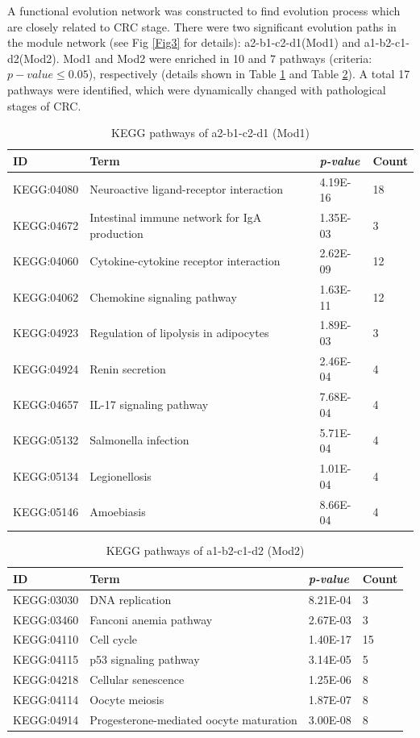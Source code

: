 \documentclass[conference]{IEEEtran}
\begin{document}
A functional evolution  network was constructed to find evolution process which are closely related to CRC stage.
There were two significant evolution paths in the module network (see Fig \ref{Fig3} for details): a2-b1-c2-d1(Mod1) and a1-b2-c1-d2(Mod2). 
Mod1 and Mod2 were enriched in 10 and 7 pathways (criteria: $p-value \leqslant 0.05$), respectively (details shown in Table \ref{tab5} and Table \ref{tab6}). 
A total 17 pathways were identified, which were dynamically changed with pathological stages of CRC. 

\begin{table}[htbp]
	\caption{KEGG pathways of a2-b1-c2-d1 (Mod1)}
	\label{tab5}
	\begin{center}
		\begin{tabular}{lp{3.5cm}ll}
			\hline
			ID & Term & \emph{p-value} & Count\\
			\hline
			KEGG:04080&Neuroactive ligand-receptor interaction&	4.19E-16&	18 \\
			KEGG:04672&Intestinal immune network for IgA production&	1.35E-03&	3 \\
			KEGG:04060&Cytokine-cytokine receptor interaction&	2.62E-09&	12 \\
			KEGG:04062&Chemokine signaling pathway&	1.63E-11&	12 \\
			KEGG:04923&Regulation of lipolysis in adipocytes&	1.89E-03&	3\\ 
			KEGG:04924&Renin secretion&	2.46E-04&	4 \\
			KEGG:04657&IL-17 signaling pathway&	7.68E-04&	4 \\
			KEGG:05132&Salmonella infection&	5.71E-04&	4 \\
			KEGG:05134&Legionellosis&	1.01E-04&	4 \\
			KEGG:05146&Amoebiasis&	8.66E-04&	4 \\
			\hline	
		\end{tabular}
	\end{center}		
\end{table}

\begin{table}[htbp]
	\caption{KEGG pathways of a1-b2-c1-d2 (Mod2)}
	\label{tab6}
	\begin{center}
		\begin{tabular}{lp{3.5cm}ll}
			\hline
			ID & Term & \emph{p-value} & Count\\
			\hline
			KEGG:03030&DNA replication&	8.21E-04&	3 \\
			KEGG:03460&Fanconi anemia pathway&	2.67E-03&	3 \\
			KEGG:04110&Cell cycle&	1.40E-17&	15 \\
			KEGG:04115&p53 signaling pathway&	3.14E-05&	5 \\
			KEGG:04218&Cellular senescence&	1.25E-06&	8 \\
			KEGG:04114&Oocyte meiosis&	1.87E-07&	8 \\
			KEGG:04914&Progesterone-mediated oocyte maturation&	3.00E-08&	8 \\
			\hline	
		\end{tabular}
	\end{center}	
\end{table}
\end{document}
